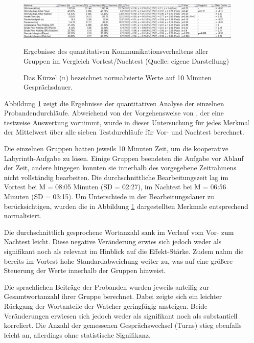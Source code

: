 \begin{figure}[ht]
\centering
\includegraphics[width=1\linewidth]{content/pictures/quantitative_communication_results.png}
\caption{Ergebnisse des quantitativen Kommunikationsverhaltens aller Gruppen im Vergleich Vortest/Nachtest (Quelle: eigene Darstellung)}
\caption*{\footnotesize Das Kürzel (n) bezeichnet normalisierte Werte auf 10 Minuten Gesprächsdauer.}
\label{fig:communication-results}
\end{figure}

 Abbildung \ref{fig:communication-results} zeigt die Ergebnisse der quantitativen Analyse der einzelnen Probandendurchläufe. Abweichend von der Vorgehensweise von \citeauthor{nasir_effect_2015}, der eine testweise Auswertung vornimmt, wurde in dieser Untersuchung für jedes Merkmal der Mittelwert über alle sieben Testdurchläufe für Vor- und Nachtest berechnet.

 Die einzelnen Gruppen hatten jeweils 10 Minuten Zeit, um die kooperative Labyrinth-Aufgabe zu lösen. Einige Gruppen beendeten die Aufgabe vor Ablauf der Zeit, andere hingegen konnten sie innerhalb des vorgegebene Zeitrahmens nicht vollständig bearbeiten. Die durchschnittliche Bearbeitungszeit lag im Vortest bei M = 08:05 Minuten (SD = 02:27), im Nachtest bei M = 06:56 Minuten (SD = 03:15). Um Unterschiede in der Bearbeitungsdauer zu berücksichtigen, wurden die in Abbildung \ref{fig:communication-results} dargestellten Merkmale entsprechend normalisiert.

 Die durchschnittlich gesprochene Wortanzahl sank im Verlauf vom Vor- zum Nachtest leicht. Diese negative Veränderung erwies sich jedoch weder als signifikant noch als relevant im Hinblick auf die Effekt-Stärke. Zudem nahm die bereits im Vortest hohe Standardabweichung weiter zu, was auf eine größere Steuerung der Werte innerhalb der Gruppen hinweist.

 Die sprachlichen Beiträge der Probanden wurden jeweils anteilig zur Gesamtwortanzahl ihrer Gruppe berechnet. Dabei zeigte sich ein leichter Rückgang der Wortanteile der Watcher geringfügig ansteigen. Beide Veränderungen erwiesen sich jedoch weder als signifikant noch als substantiell korreliert. Die Anzahl der gemessenen Gesprächswechsel (Turns) stieg ebenfalls leicht an, allerdings ohne statistische Signifikanz.

